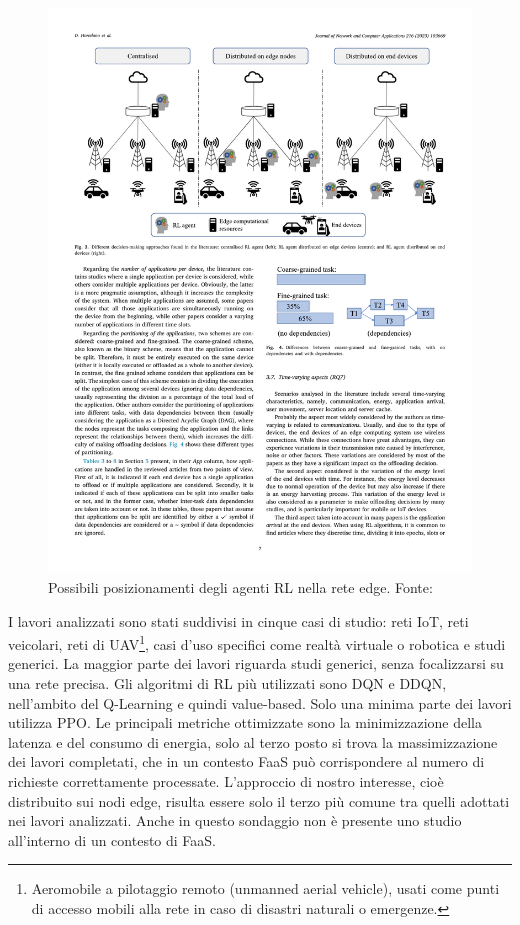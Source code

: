 \begin{figure}
    \centering
    \includegraphics[width=\textwidth]{assets/3/rl_decision_approaches.pdf}
    \caption[Possibili posizionamenti degli agenti RL nella rete edge]{Possibili posizionamenti degli agenti RL nella rete edge. Fonte: \cite{Hortelano2023}}
    \label{fig:2_rl_decision_approaches}
\end{figure}

I lavori analizzati sono stati suddivisi in cinque casi di studio: reti IoT, reti veicolari, reti di UAV\footnote{Aeromobile a pilotaggio remoto (unmanned aerial vehicle), usati come punti di accesso mobili alla rete in caso di disastri naturali o emergenze.}, casi d'uso specifici come realtà virtuale o robotica e studi generici. La maggior parte dei lavori riguarda studi generici, senza focalizzarsi su una rete precisa. Gli algoritmi di RL più utilizzati sono DQN e DDQN, nell'ambito del Q-Learning e quindi value-based. Solo una minima parte dei lavori utilizza PPO. Le principali metriche ottimizzate sono la minimizzazione della latenza e del consumo di energia, solo al terzo posto si trova la massimizzazione dei lavori completati, che in un contesto FaaS può corrispondere al numero di richieste correttamente processate. L'approccio di nostro interesse, cioè distribuito sui nodi edge, risulta essere solo il terzo più comune tra quelli adottati nei lavori analizzati. Anche in questo sondaggio non è presente uno studio all'interno di un contesto di FaaS.

